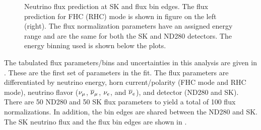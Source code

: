 \begin{figure}
\begin{centering}
\par\end{centering}
\caption[Neutrino Flux Prediction at SK and Flux Bin Edges]{Neutrino flux prediction at SK and flux bin edges. The flux prediction
for FHC (RHC) mode is shown in figure on the left (right). The flux
normalization parameters have an assigned energy range and are the
same for both the SK and ND280 detectors. The energy binning used
is shown below the plots. \label{fig:UnoscillatedFluxSK}}
\end{figure}

The tabulated flux parameters/bins and uncertainties in this analysis
are given in . These are the first set
of parameters in the fit. The flux parameters are differentiated by
neutrino energy, horn current/polarity (FHC mode and RHC mode), neutrino
flavor ($\nu_{\mu}$, $\overline{\nu}_{\mu}$, $\nu_{e}$, and $\overline{\nu}_{e}$), and detector
(ND280 and SK). There are 50 ND280 and 50 SK flux parameters to yield
a total of 100 flux normalizations. In addition, the bin edges are
shared between the ND280 and SK. The SK neutrino flux and the flux
bin edges are shown in . \newpage{}

